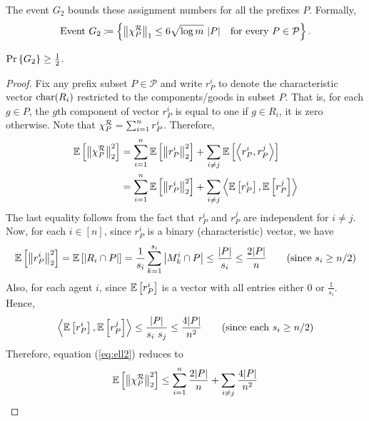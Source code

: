 The event $G_2$ bounds these assignment numbers for all the prefixes $P$. Formally, 
\begin{align*}
\text{Event } G_2 \coloneqq \left\{ \left\|\chi^{\mathcal{R}}_P\right\|_1\leq 6 \sqrt{\log m}\ |P| \ \ \text{ for every } P\in\mathcal{P} \right\}.
\end{align*}

\begin{lemma}
\label{lem:dyadic-prefixes} $\Pr \left\{G_2\right\}\geq \frac{1}{2}$.
\end{lemma}

\begin{proof}
    Fix any prefix subset $P\in \mathcal{P}$ and write $r^i_P$ to denote the characteristic vector $\mathrm{char}(R_i)$ restricted to the components/goods in subset $P$. That is, for each $g \in P$, the $g$th component of vector $r^i_P$ is equal to one if $g \in R_i$, it is zero otherwise. 
    Note that $\chi^{\mathcal{R}}_P=\sum_{i=1}^n r^i_P$. Therefore, 
        \begin{align}
        \mathbb{E}\left[\left\| \chi^{\mathcal{R}}_P \right\|_2^2\right] 
        &= \sum_{i=1}^n \mathbb{E}\left[\left\| r^i_P \right\|_2^2\right] + \sum_{i\neq j} \mathbb{E}\left[\left\langle r^i_P,r^j_P\right\rangle\right] \nonumber \\
        &= \sum_{i=1}^n \mathbb{E}\left[\left\|r^i_P\right\|_2^2\right] + \sum_{i\neq j} \left\langle \mathbb{E}\left[r^i_P\right],\mathbb{E}\left[r^j_P\right] \right\rangle \label{eq:ell2}
    \end{align} 
   The last equality follows from the fact that $r^i_P$ and $r^j_P$ are independent for $i \neq j$. Now, for each $i\in [n]$, since $r_P^i$ is a binary (characteristic) vector, we have 
   \begin{align*}
       \mathbb{E}\left[\left\|r^i_P\right\|_2^2\right]
       =\mathbb{E}\left[\left|R_i\cap P\right|\right]
       =\frac{1}{s_i} \sum_{k=1}^{s_i} \left|M^i_k\cap P\right|
       \leq \frac{|P|}{s_i}
       \leq \frac{2|P|}{n} \tag{since $s_i \geq n/2$}
   \end{align*}
    Also, for each agent $i$, since $\mathbb{E}\left[r^i_P\right]$ is a vector with all entries either $0$ or $\frac{1}{s_i}$. Hence,  
    \begin{align*}
        \left\langle \mathbb{E}\left[r^i_P\right],\mathbb{E}\left[r^j_P\right] \right\rangle \leq \frac{|P|}{s_i\  s_j}\leq\frac{4|P|}{n^2} \tag{since each $s_i \geq n/2$}
    \end{align*}
    Therefore, equation (\ref{eq:ell2}) reduces to 
    \begin{align}
    \expval{\left\|\chi^\calR_P\right\|_2^2}
    \leq \sum_{i=1}^n \frac{2|P|}{n} + \sum_{i\neq j} \frac{4|P|}{n^2} 

\end{align}
\end{proof}
